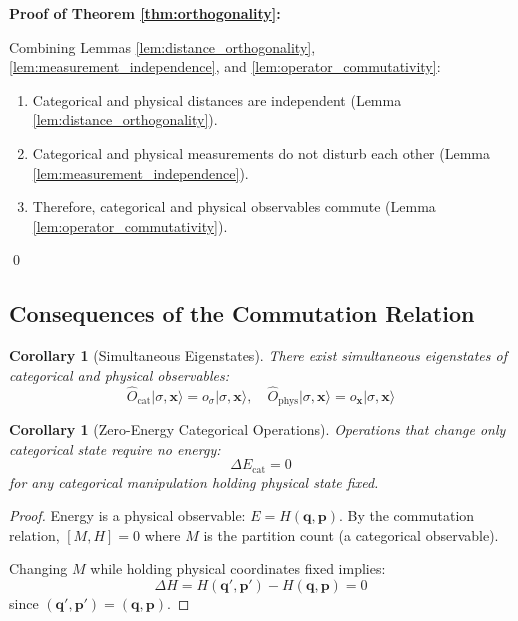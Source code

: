 \documentclass[twocolumn,10pt,twoside]{article}
\newtheorem{corollary}[theorem]{Corollary}
\newcommand{\Ocat}{\hat{O}_{\mathrm{cat}}}
\newcommand{\Ophys}{\hat{O}_{\mathrm{phys}}}
\begin{document}
\textbf{Proof of Theorem \ref{thm:orthogonality}:}

Combining Lemmas \ref{lem:distance_orthogonality}, \ref{lem:measurement_independence}, and \ref{lem:operator_commutativity}:
\begin{enumerate}
    \item Categorical and physical distances are independent (Lemma \ref{lem:distance_orthogonality}).
    \item Categorical and physical measurements do not disturb each other (Lemma \ref{lem:measurement_independence}).
    \item Therefore, categorical and physical observables commute (Lemma \ref{lem:operator_commutativity}).
\end{enumerate}
\qed

\subsection{Consequences of the Commutation Relation}

\begin{corollary}[Simultaneous Eigenstates]
\label{cor:simultaneous}
There exist simultaneous eigenstates of categorical and physical observables:
\begin{equation}
\Ocat |\sigma, \mathbf{x}\rangle = o_{\sigma} |\sigma, \mathbf{x}\rangle, \quad \Ophys |\sigma, \mathbf{x}\rangle = o_{\mathbf{x}} |\sigma, \mathbf{x}\rangle
\end{equation}
\end{corollary}

\begin{corollary}[Zero-Energy Categorical Operations]
\label{cor:zero_energy}
Operations that change only categorical state require no energy:
\begin{equation}
\Delta E_{\text{cat}} = 0
\end{equation}
for any categorical manipulation holding physical state fixed.
\end{corollary}

\begin{proof}
Energy is a physical observable: $E = H(\mathbf{q}, \mathbf{p})$. By the commutation relation, $[M, H] = 0$ where $M$ is the partition count (a categorical observable).

Changing $M$ while holding physical coordinates fixed implies:
\begin{equation}
\Delta H = H(\mathbf{q}', \mathbf{p}') - H(\mathbf{q}, \mathbf{p}) = 0
\end{equation}
since $(\mathbf{q}', \mathbf{p}') = (\mathbf{q}, \mathbf{p})$.
\end{proof}
\end{document}
